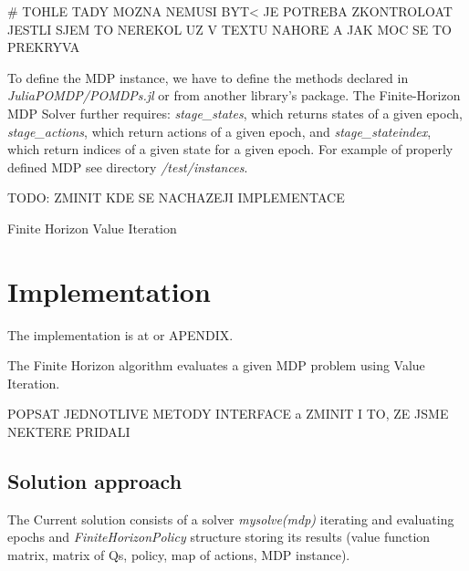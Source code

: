 # TOHLE TADY MOZNA NEMUSI BYT< JE POTREBA ZKONTROLOAT JESTLI SJEM TO NEREKOL UZ V TEXTU NAHORE A JAK MOC SE TO PREKRYVA

To define the MDP instance, we have to define the methods declared in \textit{JuliaPOMDP/POMDPs.jl} \cite{JMLR:v18:16-300} or from another library's package. The Finite-Horizon MDP Solver further requires: \textit{stage\_states}, which returns states of a given epoch, \textit{stage\_actions}, which return actions of a given epoch, and \textit{stage\_stateindex}, which return indices of a given state for a given epoch. For example of properly defined MDP see directory \textit{/test/instances}.

TODO: ZMINIT KDE SE NACHAZEJI IMPLEMENTACE





Finite Horizon Value Iteration




\section{Implementation}

The implementation is at \cite{FHPOMDP} or APENDIX.

The Finite Horizon algorithm evaluates a given MDP problem using Value Iteration.  





POPSAT JEDNOTLIVE METODY INTERFACE a ZMINIT I TO, ZE JSME NEKTERE PRIDALI

\subsection{Solution approach}

 The Current solution consists of a solver \textit{mysolve(mdp)} iterating and evaluating epochs and \textit{FiniteHorizonPolicy} structure storing its results (value function matrix, matrix of Qs, policy, map of actions, MDP instance). 
 
 

